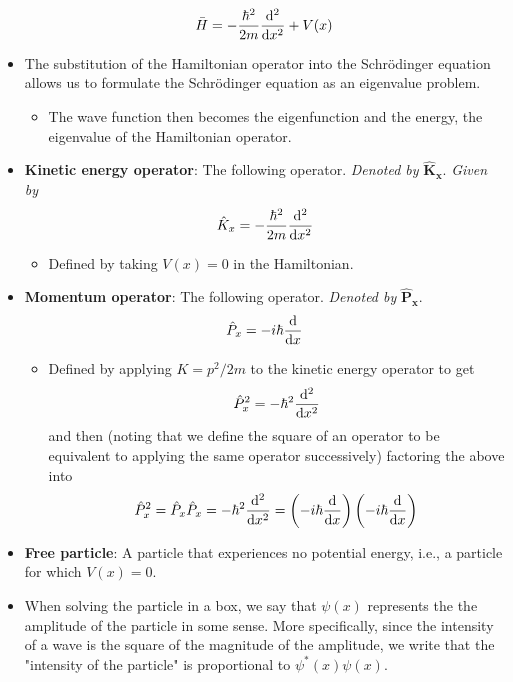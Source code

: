 \documentclass[../notes.tex]{subfiles}
\begin{document}
\begin{itemize}
    \begin{equation*}
        \bar{H} = -\frac{\hbar^2}{2m}\dv[2]{x}+V(x)
    \end{equation*}
    \item The substitution of the Hamiltonian operator into the Schr\"{o}dinger equation allows us to formulate the Schr\"{o}dinger equation as an eigenvalue problem.
    \begin{itemize}
        \item The wave function then becomes the eigenfunction and the energy, the eigenvalue of the Hamiltonian operator.
    \end{itemize}
    \item \textbf{Kinetic energy operator}: The following operator. \emph{Denoted by} $\bm{\hat{K}_x}$. \emph{Given by}
    \begin{equation*}
        \hat{K}_x = -\frac{\hbar^2}{2m}\dv[2]{x}
    \end{equation*}
    \begin{itemize}
        \item Defined by taking $V(x)=0$ in the Hamiltonian.
    \end{itemize}
    \item \textbf{Momentum operator}: The following operator. \emph{Denoted by} $\bm{\hat{P}_x}$.
    \begin{equation*}
        \hat{P}_x = -i\hbar\dv{x}
    \end{equation*}
    \begin{itemize}
        \item Defined by applying $K=p^2/2m$ to the kinetic energy operator to get
        \begin{equation*}
            \hat{P}_x^2 = -\hbar^2\dv[2]{x}
        \end{equation*}
        and then (noting that we define the square of an operator to be equivalent to applying the same operator successively) factoring the above into
        \begin{equation*}
            \hat{P}_x^2 = \hat{P}_x\hat{P}_x = -\hbar^2\dv[2]{x} = \left( -i\hbar\dv{x} \right)\left( -i\hbar\dv{x} \right)
        \end{equation*}
    \end{itemize}
    \item \textbf{Free particle}: A particle that experiences no potential energy, i.e., a particle for which $V(x)=0$.
    \item When solving the particle in a box, we say that $\psi(x)$ represents the the amplitude of the particle in some sense. More specifically, since the intensity of a wave is the square of the magnitude of the amplitude, we write that the "intensity of the particle" is proportional to $\psi^*(x)\psi(x)$.

\end{itemize}
\end{document}
